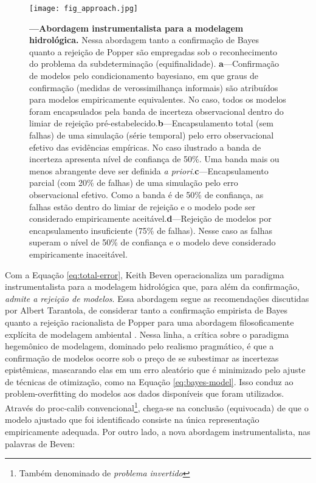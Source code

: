 \documentclass[./main.tex]{subfiles}
\begin{document}
\begin{figure}[t!] %
	\centering				
	\texttt{[image: fig\_approach.jpg]}		
	\caption[Abordagem instrumentalista para a modelagem hidrológica]
	{\textbf{---\;Abordagem instrumentalista para a modelagem hidrológica.}
        Nessa abordagem tanto a confirmação de Bayes quanto a rejeição de Popper são empregadas sob o reconhecimento do problema da subdeterminação (equifinalidade). \;\textbf{a}\;---\;Confirmação de modelos pelo condicionamento bayesiano, em que graus de confirmação (medidas de verossimilhança informais) são atribuídos para modelos empiricamente equivalentes. No caso, todos os modelos foram encapsulados pela banda de incerteza observacional dentro do limiar de rejeição pré-estabelecido.\;\textbf{b}\;---\;Encapsulamento total (sem falhas) de uma simulação (série temporal) pelo erro observacional efetivo das evidências empíricas. No caso ilustrado a banda de incerteza apresenta nível de confiança de 50\%. Uma banda mais ou menos abrangente deve ser definida \textit{a priori}.\;\textbf{c}\;---\;Encapsulamento parcial (com 20\% de falhas) de uma simulação pelo erro observacional efetivo. Como a banda é de 50\% de confiança, as falhas estão dentro do limiar de rejeição e o modelo pode ser considerado empiricamente aceitável.\;\textbf{d}\;---\;Rejeição de modelos por encapsulamento insuficiente (75\% de falhas). Nesse caso as falhas superam o nível de 50\% de confiança e o modelo deve considerado empiricamente inaceitável.\;
	}
\label{fig:approach}  %
\end{figure}

\par Com a Equação \eqref{eq:total-error}, Keith Beven operacionaliza um paradigma instrumentalista para a modelagem hidrológica que, para além da confirmação, \textit{admite a rejeição de modelos}. Essa abordagem segue as recomendações discutidas por Albert Tarantola, de considerar tanto a confirmação empirista de Bayes quanto a rejeição racionalista de Popper para uma abordagem filosoficamente explícita de modelagem ambiental \cite{Tarantola2006}. Nessa linha, a crítica sobre o paradigma hegemônico de modelagem, dominado pelo realismo pragmático, é que a confirmação de modelos ocorre sob o preço de se subestimar as incertezas epistêmicas, mascarando elas em um erro aleatório que é minimizado pelo ajuste de técnicas de otimização, como na Equação \eqref{eq:bayes-model}. Isso conduz ao \gls{problem-overfitting} do modelos aos dados disponíveis que foram utilizados. Através do \gls{proc-calib} convencional\footnote{Também denominado de \textit{problema invertido}}, chega-se na conclusão (equivocada) de que o modelo ajustado que foi identificado consiste na única representação empiricamente adequada. Por outro lado, a nova abordagem instrumentalista, nas palavras de Beven:
\end{document}
